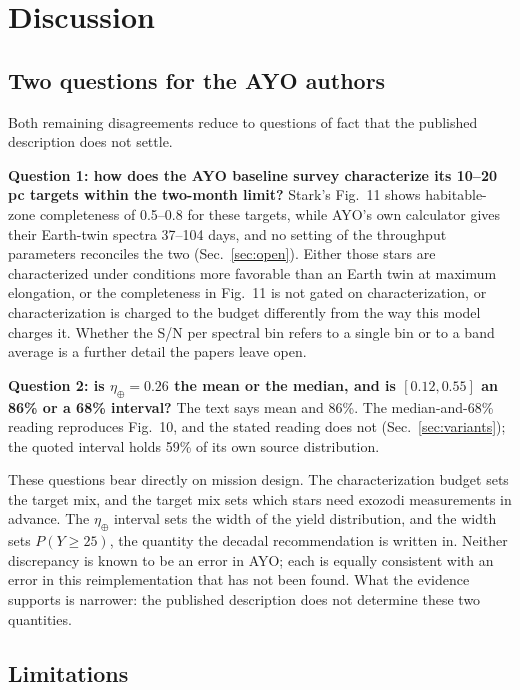 \documentclass[11pt,a4paper]{article}
\begin{document}
\section{Discussion}
\label{sec:discussion}

\subsection{Two questions for the AYO authors}

Both remaining disagreements reduce to questions of fact that the published description does not
settle.

\textbf{Question 1: how does the AYO baseline survey characterize its 10--20\,pc targets within
the two-month limit?} Stark's Fig.~11 shows habitable-zone completeness of 0.5--0.8 for these
targets, while AYO's own calculator gives their Earth-twin spectra 37--104 days, and no setting of
the throughput parameters reconciles the two (Sec.~\ref{sec:open}). Either those stars are
characterized under conditions more favorable than an Earth twin at maximum elongation, or the
completeness in Fig.~11 is not gated on characterization, or characterization is charged to the
budget differently from the way this model charges it. Whether the S/N per spectral bin refers to
a single bin or to a band average is a further detail the papers leave open.

\textbf{Question 2: is $\eta_\oplus = 0.26$ the mean or the median, and is $[0.12, 0.55]$ an 86\%
or a 68\% interval?} The text says mean and 86\%. The median-and-68\% reading reproduces Fig.~10,
and the stated reading does not (Sec.~\ref{sec:variants}); the quoted interval holds
59\% of its own source distribution.

These questions bear directly on mission design. The characterization budget sets the target mix,
and the target mix sets which stars need exozodi measurements in advance. The $\eta_\oplus$
interval sets the width of the yield distribution, and the width sets $P(Y \ge 25)$, the quantity
the decadal recommendation is written in. Neither discrepancy is known to be an error in AYO; each
is equally consistent with an error in this reimplementation that has not been found. What the
evidence supports is narrower: the published description does not determine these two quantities.

\subsection{Limitations}
\end{document}
